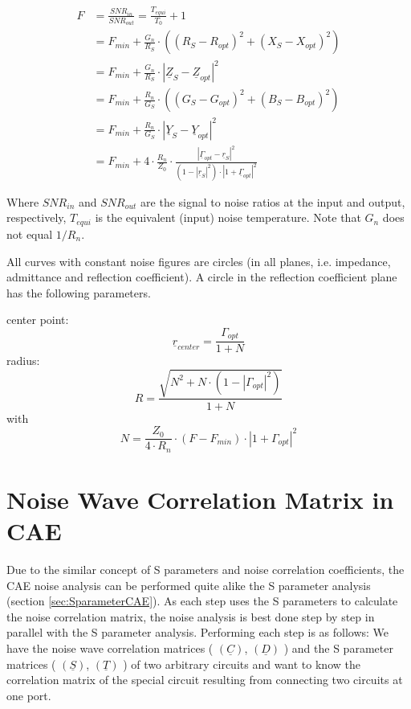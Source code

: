 \documentclass[10pt]{report}
\begin{document}
\begin{align}
  F & = \frac{SNR_{in}}{SNR_{out}} = \frac{T_{equi}}{T_0} + 1\\
    & = F_{min} + \frac{G_n}{R_S}\cdot\left( (R_S-R_{opt})^2 + (X_S-X_{opt})^2 \right)\\
    & = F_{min} + \frac{G_n}{R_S}\cdot\left| \underline{Z}_S - \underline{Z}_{opt} \right| ^2\\
    & = F_{min} + \frac{R_n}{G_S}\cdot\left( (G_S-G_{opt})^2 + (B_S-B_{opt})^2 \right)\\
    & = F_{min} + \frac{R_n}{G_S}\cdot\left| \underline{Y}_S - \underline{Y}_{opt} \right| ^2\\
    & = F_{min} + 4\cdot\frac{R_n}{Z_0}\cdot\frac{\left| \underline{\Gamma}_{opt}-\underline{r}_S\right| ^2}
                  {\left( 1-|\underline{r}_S|^2\right)\cdot\left| 1+\underline{\Gamma}_{opt}\right| ^2}
\end{align}

Where $SNR_{in}$ and $SNR_{out}$ are the signal to noise ratios at the
input and output, respectively, $T_{equi}$ is the equivalent (input)
noise temperature.  Note that $G_n$ does not equal $1/R_n$.

\addvspace{12pt}

All curves with constant noise figures are circles (in all planes,
i.e. impedance, admittance and reflection coefficient).  A circle in
the reflection coefficient plane has the following parameters.

\addvspace{12pt}

center point:
\begin{equation}
\underline{r}_{center} = \frac{\Gamma_{opt}}{1+N}
\end{equation}
radius:
\begin{equation}
R = \frac{\sqrt{N^2 + N\cdot(1-|\Gamma_{opt}|^2)}}{1+N}
\end{equation}
with
\begin{equation}
N = \frac{Z_0}{4\cdot R_n}\cdot (F-F_{min})\cdot |1+\Gamma_{opt}|^2
\end{equation}


\section{Noise Wave Correlation Matrix in CAE}

Due to the similar concept of S parameters and noise correlation
coefficients, the CAE noise analysis can be performed quite alike the
S parameter analysis (section \ref{sec:SparameterCAE}). As each step
uses the S parameters to calculate the noise correlation matrix, the
noise analysis is best done step by step in parallel with the S
parameter analysis.  Performing each step is as follows: We have the
noise wave correlation matrices ( $(\underline{C})$, $(\underline{D})$
) and the S parameter matrices ( $(\underline{S})$, $(\underline{T})$
) of two arbitrary circuits and want to know the correlation matrix of
the special circuit resulting from connecting two circuits at one
port.
\end{document}
